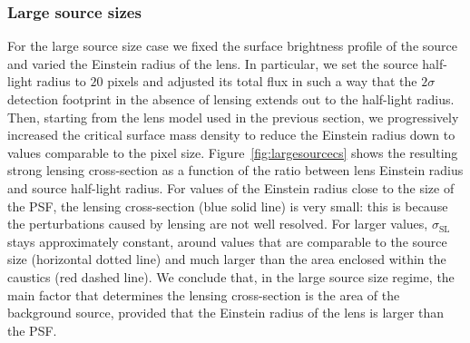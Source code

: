 \documentclass{aa}
\def\crosssect{\sigma_\mathrm{{SL}}}
\def\Fref#1{Figure~\ref{#1}\xspace}
\begin{document}
\subsubsection{Large source sizes}

For the large source size case we fixed the surface brightness profile of the source and varied the Einstein radius of the lens.
In particular, we set the source half-light radius to $20$ pixels and adjusted its total flux in such a way that the $2\sigma$ detection footprint in the absence of lensing extends out to the half-light radius.
Then, starting from the lens model used in the previous section, we progressively increased the critical surface mass density to reduce the Einstein radius down to values comparable to the pixel size.
\Fref{fig:largesourcecs} shows the resulting strong lensing cross-section as a function of the ratio between lens Einstein radius and source half-light radius.
For values of the Einstein radius close to the size of the PSF, the lensing cross-section (blue solid line) is very small: this is because the perturbations caused by lensing are not well resolved.
For larger values, $\crosssect$ stays approximately constant, around values that are comparable to the source size (horizontal dotted line) and much larger than the area enclosed within the caustics (red dashed line).
We conclude that, in the large source size regime, the main factor that determines the lensing cross-section is the area of the background source, provided that the Einstein radius of the lens is larger than the PSF.
\end{document}
